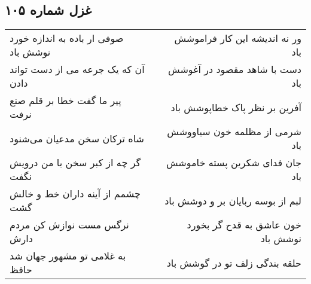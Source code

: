 \begin{center}
\section*{غزل شماره ۱۰۵}
\label{sec:sh105}
\begin{longtable}{l p{0.5cm} r}
صوفی ار باده به اندازه خورد نوشش باد
&&
ور نه اندیشه این کار فراموشش باد
\\
آن که یک جرعه می از دست تواند دادن
&&
دست با شاهد مقصود در آغوشش باد
\\
پیر ما گفت خطا بر قلم صنع نرفت
&&
آفرین بر نظر پاک خطاپوشش باد
\\
شاه ترکان سخن مدعیان می‌شنود
&&
شرمی از مظلمه خون سیاووشش باد
\\
گر چه از کبر سخن با من درویش نگفت
&&
جان فدای شکرین پسته خاموشش باد
\\
چشمم از آینه داران خط و خالش گشت
&&
لبم از بوسه ربایان بر و دوشش باد
\\
نرگس مست نوازش کن مردم دارش
&&
خون عاشق به قدح گر بخورد نوشش باد
\\
به غلامی تو مشهور جهان شد حافظ
&&
حلقه بندگی زلف تو در گوشش باد
\\
\end{longtable}
\end{center}
